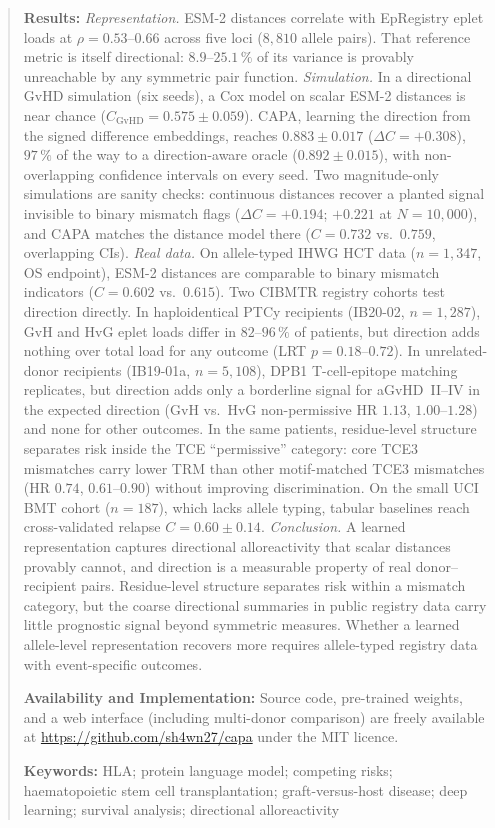 \documentclass[11pt,a4paper]{article}
\begin{document}
\begin{abstract}
\medskip\noindent\textbf{Results:}
\emph{Representation.}  ESM-2 distances correlate with EpRegistry eplet
loads at $\rho = 0.53$--$0.66$ across five loci ($8{,}810$ allele pairs).  That
reference metric is itself directional: $8.9$--$25.1\,\%$ of its variance is
provably unreachable by any symmetric pair function.
\emph{Simulation.}  In a directional GvHD simulation (six seeds), a Cox model
on scalar ESM-2 distances is near chance ($C_{\mathrm{GvHD}} = 0.575 \pm
0.059$).  CAPA, learning the direction from the signed difference embeddings,
reaches $0.883 \pm 0.017$ ($\Delta C = +0.308$), $97\,\%$ of the way to a
direction-aware oracle ($0.892 \pm 0.015$), with non-overlapping confidence
intervals on every seed.  Two magnitude-only simulations are sanity checks:
continuous distances recover a planted signal invisible to binary mismatch
flags ($\Delta C = +0.194$; $+0.221$ at $N=10{,}000$), and CAPA matches the
distance model there ($C = 0.732$ vs.\ $0.759$, overlapping CIs).
\emph{Real data.}  On allele-typed IHWG HCT data ($n=1{,}347$, OS endpoint),
ESM-2 distances are comparable to binary mismatch indicators ($C = 0.602$
vs.\ $0.615$).  Two CIBMTR registry cohorts test direction directly.  In
haploidentical PTCy recipients (IB20-02, $n=1{,}287$), GvH and HvG eplet
loads differ in $82$--$96\,\%$ of patients, but direction adds nothing over
total load for any outcome (LRT $p = 0.18$--$0.72$).  In unrelated-donor
recipients (IB19-01a, $n=5{,}108$), DPB1 T-cell-epitope matching replicates,
but direction adds only a borderline signal for aGvHD~II--IV in the expected
direction (GvH vs.\ HvG non-permissive HR $1.13$, $1.00$--$1.28$) and none
for other outcomes.  In the same patients, residue-level structure separates
risk inside the TCE ``permissive'' category: core TCE3 mismatches carry lower
TRM than other motif-matched TCE3 mismatches (HR $0.74$, $0.61$--$0.90$)
without improving discrimination.  On the small UCI BMT cohort ($n=187$), which lacks
allele typing, tabular baselines reach cross-validated relapse
$C = 0.60 \pm 0.14$.
\emph{Conclusion.}  A learned representation captures directional
alloreactivity that scalar distances provably cannot, and direction is a
measurable property of real donor--recipient pairs.  Residue-level structure
separates risk within a mismatch category, but the coarse directional
summaries in public registry data carry little prognostic signal beyond
symmetric measures.  Whether a learned allele-level representation
recovers more requires allele-typed registry data with event-specific
outcomes.

\medskip\noindent\textbf{Availability and Implementation:}
Source code, pre-trained weights, and a web interface (including multi-donor
comparison) are freely available at
\url{https://github.com/sh4wn27/capa} under the MIT licence.

\medskip\noindent\textbf{Keywords:} HLA; protein language model; competing
risks; haematopoietic stem cell transplantation; graft-versus-host disease;
deep learning; survival analysis; directional alloreactivity
\end{abstract}
\end{document}
